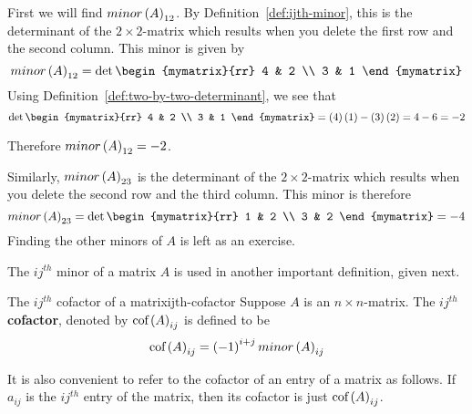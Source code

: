\begin{solution} First we will find $minor\left(A\right) _{12}$. By Definition~\ref{def:ijth-minor}, this is the determinant of the $2\times 2$-matrix
which results when you delete the first row and the second column. This
minor is given by
\begin{equation*}
minor \tup{A}_{12}
=
\det \begin{mymatrix}{rr}
4 & 2 \\
3 & 1
\end{mymatrix}
\end{equation*}
Using Definition~\ref{def:two-by-two-determinant}, we see that 
\begin{equation*}
\det \begin{mymatrix}{rr}
4 & 2 \\
3 & 1
\end{mymatrix} = \tup{4}\tup{1} - \tup{3}\tup{2} = 4 - 6 = -2
\end{equation*}

Therefore $minor \left(A\right)_{12} = -2$. 

Similarly, $minor\left(A\right)_{23}$ is the determinant of the $2\times 2$-matrix
which results when you delete the second row and the third column. This
minor is therefore
\begin{equation*}
minor \tup{A}_{23} 
=
\det \begin{mymatrix}{rr}
1 & 2 \\
3 & 2
\end{mymatrix} = -4
\end{equation*}
Finding the other minors of $A$ is left as an exercise. 
\end{solution}

The $ij^{th}$ minor of a matrix $A$ is used in another important definition, given next.

\begin{definition}{The $ij^{th}$ cofactor of a matrix}{ijth-cofactor}
Suppose $A$ is an $n\times n$-matrix. The $ij^{th}$ \textbf{cofactor}, denoted by $\mbox{\rm cof}\left(A\right) _{ij}$ is
defined to be 
\begin{equation*}
\mbox{\rm cof}\left(A\right) _{ij} = \left(-1\right) ^{i+j} minor\left(A\right)_{ij} 
\end{equation*}
\end{definition}

It is also convenient to refer to the
cofactor of an entry of a matrix as follows. If $a_{ij}$ is the $ij^{th}$ entry of the
matrix, then its cofactor is just $\mbox{\rm cof}\left(A\right) _{ij}$.

